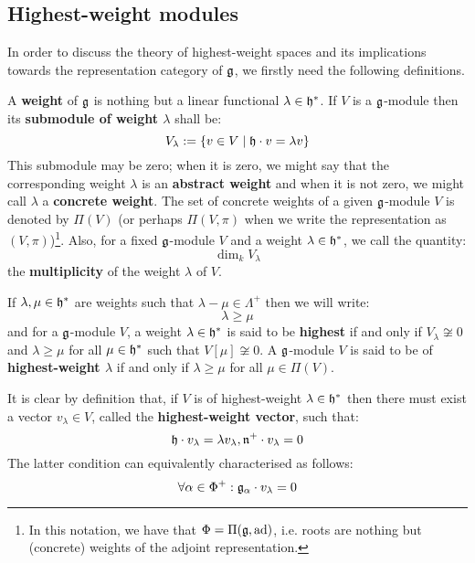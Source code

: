     \subsection{Highest-weight modules}
        In order to discuss the theory of highest-weight spaces and its implications towards the representation category of $\mathfrak{g}$, we firstly need the following definitions.
        \begin{definition} \label{def: weights_and_weight_modules}
            A \textbf{weight} of $\mathfrak{g}$ is nothing but a linear functional $\lambda \in \mathfrak{h}^*$. If $V$ is a $\mathfrak{g}$-module then its \textbf{submodule of weight $\lambda$} shall be:
                $$V_{\lambda} := \{v \in V \mid \mathfrak{h} \cdot v = \lambda v\}$$
            This submodule may be zero; when it is zero, we might say that the corresponding weight $\lambda$ is an \textbf{abstract weight} and when it is not zero, we might call $\lambda$ a \textbf{concrete weight}. The set of concrete weights of a given $\mathfrak{g}$-module $V$ is denoted by $\Pi(V)$ (or perhaps $\Pi(V, \pi)$ when we write the representation as $(V, \pi)$)\footnote{In this notation, we have that $\Phi = \Pi(\mathfrak{g}, \mathrm{ad})$, i.e. roots are nothing but (concrete) weights of the adjoint representation.}. Also, for a fixed $\mathfrak{g}$-module $V$ and a weight $\lambda \in \mathfrak{h}^*$, we call the quantity:
                $$\dim_k V_{\lambda}$$
            the \textbf{multiplicity} of the weight $\lambda$ of $V$.
        \end{definition}
        \begin{definition} \label{def: highest_weights_and_highest_weight_modules}
            If $\lambda, \mu \in \mathfrak{h}^*$ are weights such that $\lambda - \mu \in \Lambda^+$ then we will write:
                $$\lambda \geq \mu$$
            and for a $\mathfrak{g}$-module $V$, a weight $\lambda \in \mathfrak{h}^*$ is said to be \textbf{highest} if and only if $V_{\lambda} \not \cong 0$ and $\lambda \geq \mu$ for all $\mu \in \mathfrak{h}^*$ such that $V[\mu] \not \cong 0$. A $\mathfrak{g}$-module $V$ is said to be of \textbf{highest-weight $\lambda$} if and only if $\lambda \geq \mu$ for all $\mu \in \Pi(V)$.
        \end{definition}
        \begin{remark}
            It is clear by definition that, if $V$ is of highest-weight $\lambda \in \mathfrak{h}^*$ then there must exist a vector $v_{\lambda} \in V$, called the \textbf{highest-weight vector}, such that:
                $$\mathfrak{h} \cdot v_{\lambda} = \lambda v_{\lambda}, \mathfrak{n}^+ \cdot v_{\lambda} = 0$$
            The latter condition can equivalently characterised as follows:
                $$\forall \alpha \in \Phi^+: \mathfrak{g}_{\alpha} \cdot v_{\lambda} = 0$$
        \end{remark}

